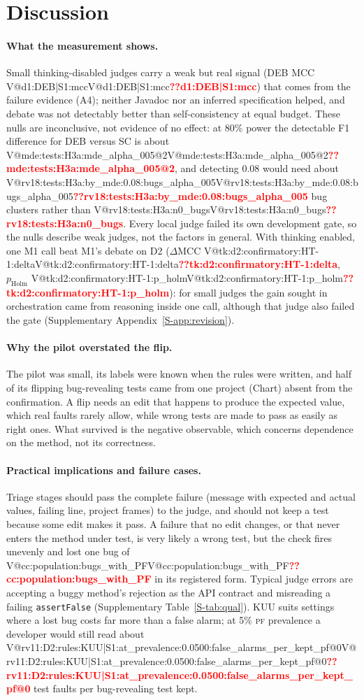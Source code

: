 \documentclass[journal]{IEEEtran}
\makeatletter
\newcommand{\V}[1]{\ifcsname V@#1\endcsname\csname V@#1\endcsname\else\textbf{\textcolor{red}{??#1}}\fi}
\newcommand{\PF}{\textsc{pf}}
\newcommand{\Sref}[1]{\ref{S-#1}}
\makeatother
\begin{document}
\section{Discussion}\label{sec:discussion}

\paragraph{What the measurement shows.} Small thinking-disabled judges carry a weak but real signal (DEB MCC \V{d1:DEB|S1:mcc}) that comes from the failure evidence (A4); neither Javadoc nor an inferred specification helped, and debate was not detectably better than self-consistency at equal budget. These nulls are inconclusive, not evidence of no effect: at 80\% power the detectable F1 difference for DEB versus SC is about \V{mde:tests:H3a:mde_alpha_005@2}, and detecting 0.08 would need about \V{rv18:tests:H3a:by_mde:0.08:bugs_alpha_005} bug clusters rather than \V{rv18:tests:H3a:n0_bugs}. Every local judge failed its own development gate, so the nulls describe weak judges, not the factors in general. With thinking enabled, one M1 call beat M1's debate on D2 ($\Delta$MCC \V{tk:d2:confirmatory:HT-1:delta}, $p_\mathrm{Holm}$ \V{tk:d2:confirmatory:HT-1:p_holm}): for small judges the gain sought in orchestration came from reasoning inside one call, although that judge also failed the gate (Supplementary Appendix~\Sref{app:revision}).

\paragraph{Why the pilot overstated the flip.} The pilot was small, its labels were known when the rules were written, and half of its flipping bug-revealing tests came from one project (Chart) absent from the confirmation. A flip needs an edit that happens to produce the expected value, which real faults rarely allow, while wrong tests are made to pass as easily as right ones. What survived is the negative observable, which concerns dependence on the method, not its correctness.

\paragraph{Practical implications and failure cases.} Triage stages should pass the complete failure (message with expected and actual values, failing line, project frames) to the judge, and should not keep a test because some edit makes it pass. A failure that no edit changes, or that never enters the method under test, is very likely a wrong test, but the check fires unevenly and lost one bug of \V{cc:population:bugs_with_PF} in its registered form. Typical judge errors are accepting a buggy method's rejection as the API contract and misreading a failing \texttt{assertFalse} (Supplementary Table~\Sref{tab:qual}). KUU suits settings where a lost bug costs far more than a false alarm; at 5\% \PF{} prevalence a developer would still read about \V{rv11:D2:rules:KUU|S1:at_prevalence:0.0500:false_alarms_per_kept_pf@0} test faults per bug-revealing test kept.
\end{document}
